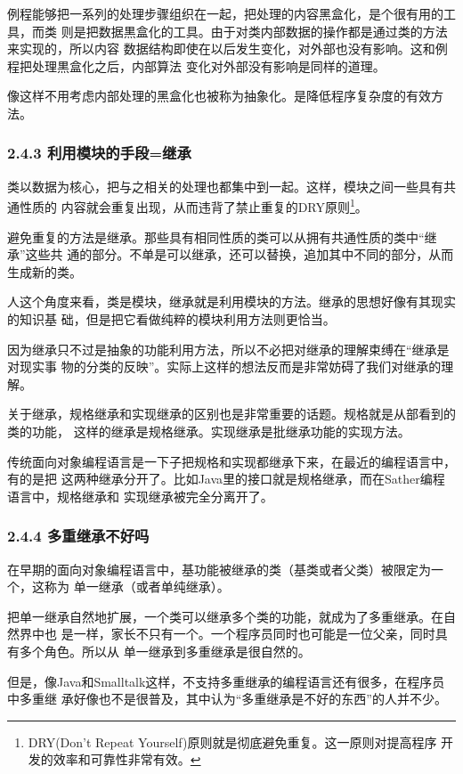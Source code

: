 \documentclass[11pt]{ctexart}
\begin{document}
例程能够把一系列的处理步骤组织在一起，把处理的内容黑盒化，是个很有用的工具，而类
则是把数据黒盒化的工具。由于对类内部数据的操作都是通过类的方法来实现的，所以内容
数据结构即使在以后发生变化，对外部也没有影响。这和例程把处理黒盒化之后，内部算法
变化对外部没有影响是同样的道理。

像这样不用考虑内部处理的黑盒化也被称为抽象化。是降低程序复杂度的有效方法。
\subsubsection{2.4.3 利用模块的手段=继承}
\label{sec:org1dfeee2}

类以数据为核心，把与之相关的处理也都集中到一起。这样，模块之间一些具有共通性质的
内容就会重复出现，从而违背了禁止重复的DRY原则\footnote{DRY(Don't Repeat Yourself)原则就是彻底避免重复。这一原则对提高程序
开发的效率和可靠性非常有效。}。

避免重复的方法是继承。那些具有相同性质的类可以从拥有共通性质的类中“继承”这些共
通的部分。不单是可以继承，还可以替换，追加其中不同的部分，从而生成新的类。

人这个角度来看，类是模块，继承就是利用模块的方法。继承的思想好像有其现实的知识基
础，但是把它看做纯粹的模块利用方法则更恰当。

因为继承只不过是抽象的功能利用方法，所以不必把对继承的理解束缚在“继承是对现实事
物的分类的反映”。实际上这样的想法反而是非常妨碍了我们对继承的理解。

关于继承，规格继承和实现继承的区别也是非常重要的话题。规格就是从部看到的类的功能，
这样的继承是规格继承。实现继承是批继承功能的实现方法。

传统面向对象编程语言是一下子把规格和实现都继承下来，在最近的编程语言中，有的是把
这两种继承分开了。比如Java里的接口就是规格继承，而在Sather编程语言中，规格继承和
实现继承被完全分离开了。
\subsubsection{2.4.4 多重继承不好吗}
\label{sec:orged7feea}

在早期的面向对象编程语言中，基功能被继承的类（基类或者父类）被限定为一个，这称为
单一继承（或者单纯继承）。

把单一继承自然地扩展，一个类可以继承多个类的功能，就成为了多重继承。在自然界中也
是一样，家长不只有一个。一个程序员同时也可能是一位父亲，同时具有多个角色。所以从
单一继承到多重继承是很自然的。

但是，像Java和Smalltalk这样，不支持多重继承的编程语言还有很多，在程序员中多重继
承好像也不是很普及，其中认为“多重继承是不好的东西”的人并不少。
\end{document}
